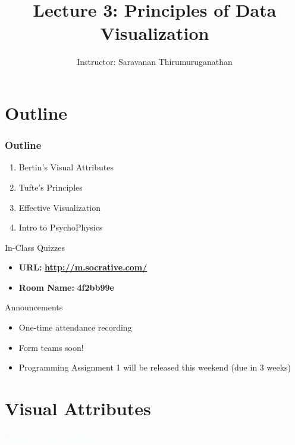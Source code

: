 \documentclass{beamer}
\title[Saravanan Thirumuruganathan] 
{Lecture 3: Principles of Data Visualization}
\author[CSE 5334] 
{Instructor: Saravanan Thirumuruganathan}
\date[]
\newcommand{\thblue}[1]{{\Huge {\textcolor{azure}{#1}}}}
\begin{document}
\begin{frame}
  \titlepage
\end{frame}


\section{Outline}

\begin{frame}
\frametitle {Outline}
\begin{enumerate}
\item Bertin's Visual Attributes
\item Tufte's Principles
\item Effective Visualization
\item Intro to PsychoPhysics
\end{enumerate}
\end{frame}


\begin{frame}{In-Class Quizzes}
\begin{itemize}
\item {\Large {\bf URL:}} {\LARGE \bf \url{http://m.socrative.com/}} 
\item {\Large {\bf Room Name:} {\LARGE \bf 4f2bb99e}}
\end{itemize}
\end{frame}

\begin{frame}{Announcements} 
    \begin{itemize}
        \item One-time attendance recording
        \item Form teams soon!
        \item Programming Assignment 1 will be released this weekend (due in 3 weeks)
    \end{itemize}
\end{frame}  

\section{Visual Attributes}
\begin{frame}{} 
    \begin{center}
        \thblue{Bertin's Visual Attributes}
    \end{center}
\end{frame}
\end{document}
